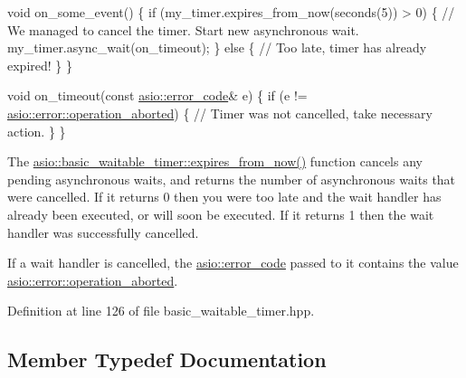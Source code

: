 \begin{DoxyCode}
\textcolor{keywordtype}{void} on\_some\_event()
\{
  \textcolor{keywordflow}{if} (my\_timer.expires\_from\_now(seconds(5)) > 0)
  \{
    \textcolor{comment}{// We managed to cancel the timer. Start new asynchronous wait.}
    my\_timer.async\_wait(on\_timeout);
  \}
  \textcolor{keywordflow}{else}
  \{
    \textcolor{comment}{// Too late, timer has already expired!}
  \}
\}

\textcolor{keywordtype}{void} on\_timeout(\textcolor{keyword}{const} \hyperlink{classasio_1_1error__code}{asio::error\_code}& e)
\{
  \textcolor{keywordflow}{if} (e != \hyperlink{namespaceasio_1_1error_a2a69445eee784059ac2f4a6c4f5fe90dacde6760763051561f6c2ffc4ddf2be1b}{asio::error::operation\_aborted})
  \{
    \textcolor{comment}{// Timer was not cancelled, take necessary action.}
  \}
\}
\end{DoxyCode}


\begin{DoxyItemize}
\item The \hyperlink{classasio_1_1basic__waitable__timer_afc1cfc8ac6584ae28d69f790a8fe0e73}{asio\+::basic\+\_\+waitable\+\_\+timer\+::expires\+\_\+from\+\_\+now()} function cancels any pending asynchronous waits, and returns the number of asynchronous waits that were cancelled. If it returns 0 then you were too late and the wait handler has already been executed, or will soon be executed. If it returns 1 then the wait handler was successfully cancelled.\end{DoxyItemize}
\begin{DoxyItemize}
\item If a wait handler is cancelled, the \hyperlink{classasio_1_1error__code}{asio\+::error\+\_\+code} passed to it contains the value \hyperlink{namespaceasio_1_1error_a2a69445eee784059ac2f4a6c4f5fe90dacde6760763051561f6c2ffc4ddf2be1b}{asio\+::error\+::operation\+\_\+aborted}. \end{DoxyItemize}


Definition at line 126 of file basic\+\_\+waitable\+\_\+timer.\+hpp.



\subsection{Member Typedef Documentation}
\hypertarget{classasio_1_1basic__waitable__timer_a1b74d12daabb5d3791f7aa42a7bdbd11}{}
